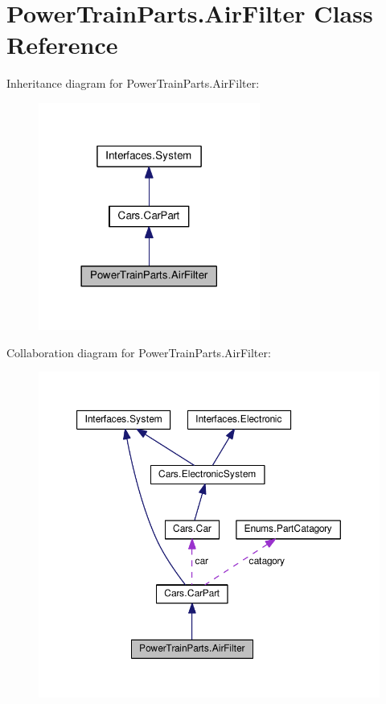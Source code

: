 \hypertarget{classPowerTrainParts_1_1AirFilter}{}\section{Power\+Train\+Parts.\+Air\+Filter Class Reference}
\label{classPowerTrainParts_1_1AirFilter}


Inheritance diagram for Power\+Train\+Parts.\+Air\+Filter\+:\nopagebreak
\begin{figure}[H]
\begin{center}
\leavevmode
\includegraphics[width=206pt]{classPowerTrainParts_1_1AirFilter__inherit__graph}
\end{center}
\end{figure}


Collaboration diagram for Power\+Train\+Parts.\+Air\+Filter\+:\nopagebreak
\begin{figure}[H]
\begin{center}
\leavevmode
\includegraphics[width=350pt]{classPowerTrainParts_1_1AirFilter__coll__graph}
\end{center}
\end{figure}
